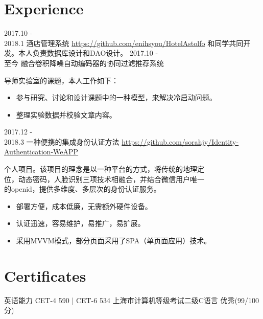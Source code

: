 \documentclass[letterpaper,UTF8]{twentysecondcv} %
\begin{document}


\section{Experience}

\begin{twenty} %
	\twentyitem
    	{2017.10 - \\2018.1}
        {酒店管理系统}
        {}
        {\href{https://github.com/sorahjy/HotelAstolfo}{https://github.com/enihsyou/HotelAstolfo}}
        {和同学共同开发。本人负责数据库设计和DAO设计。
        {%
        }}
    \twentyitem
    	{2017.10 - \\ 至今}
        {融合卷积降噪自动编码器的协同过滤推荐系统}
        {}
        {}
        {导师实验室的课题，本人工作如下：{\begin{itemize}
        \item 参与研究、讨论和设计课题中的一种模型，来解决冷启动问题。
        \item 整理实验数据并校验文章内容。
        \end{itemize}}
        }
        
    \twentyitem
   		{2017.12 - \\ 2018.3}
        {一种便携的集成身份认证方法}
        {}
        {\href{https://github.com/sorahjy/Identity-Authentication-WeAPP}{https://github.com/sorahjy/Identity-Authentication-WeAPP}}
        {个人项目。该项目的理念是以一种平台的方式，将传统的地理定\\
        位，动态密码，人脸识别三项技术相融合，并结合微信用户唯一\\
        的openid，提供多维度、多层次的身份认证服务。
        {\begin{itemize}
        \item 部署方便，成本低廉，无需额外硬件设备。
        \item 认证迅速，容易维护，易推广，易扩展。
        \item 采用MVVM模式，部分页面采用了SPA（单页面应用）技术。
    \end{itemize}}
        }
\end{twenty}

\section{Certificates}
\begin{twenty}
    \twentyitem
        {}
        {英语能力 CET-4 590 | CET-6 534}
        {}
        {}
        {}
    \twentyitem
        {}
        {上海市计算机等级考试二级C语言 优秀(99/100分)}
        {}
        {}
        {}
\end{twenty}
\end{document}
